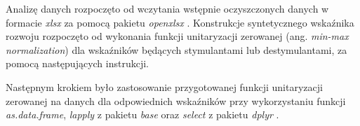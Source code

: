\documentclass{amuthesis}
\begin{document}
Analizę danych rozpoczęto od wczytania wstępnie oczyszczonych danych w formacie \emph{xlsx} za pomocą pakietu \emph{openxlsx} \autocite{R-openxlsx}.
Konstrukcje syntetycznego wskaźnika rozwoju rozpoczęto od wykonania funkcji unitaryzacji zerowanej (ang. \emph{min-max normalization}) dla wskaźników będących stymulantami lub destymulantami, za pomocą następujących instrukcji.

\begin{Shaded}
\begin{Highlighting}[]
\OtherTok{\textless{}{-}}  \NormalTok{) \{}
  \SpecialCharTok{{-}} \SpecialCharTok{/}\NormalTok{(}\SpecialCharTok{{-}}
\NormalTok{\}}
\OtherTok{\textless{}{-}}  \NormalTok{) \{}
  \NormalTok{((}\SpecialCharTok{{-}}\SpecialCharTok{/}\NormalTok{(}\SpecialCharTok{{-}}
\NormalTok{\}}
\end{Highlighting}
\end{Shaded}

Następnym krokiem było zastosowanie przygotowanej funkcji unitaryzacji zerowanej na danych dla odpowiednich wskaźników przy wykorzystaniu funkcji \emph{as.data.frame}, \emph{lapply} z pakietu \emph{base} \autocite{R-base} oraz \emph{select} z pakietu \emph{dplyr} \autocite{R-dplyr}.
\end{document}
